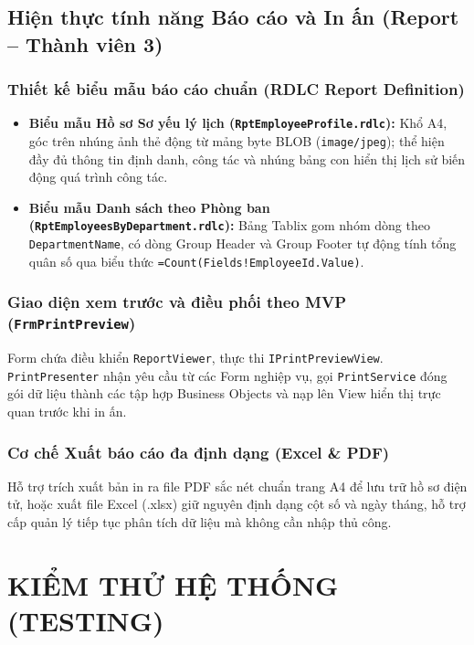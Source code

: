 \documentclass[12pt,a4paper]{report}
\begin{document}
\section{Hiện thực tính năng Báo cáo và In ấn (Report -- Thành viên 3)}

\subsection{Thiết kế biểu mẫu báo cáo chuẩn (RDLC Report Definition)}
\begin{itemize}[leftmargin=1.0cm]
    \item \textbf{Biểu mẫu Hồ sơ Sơ yếu lý lịch (\texttt{RptEmployeeProfile.rdlc}):} Khổ A4, góc trên nhúng ảnh thẻ động từ mảng byte BLOB (\texttt{image/jpeg}); thể hiện đầy đủ thông tin định danh, công tác và nhúng bảng con hiển thị lịch sử biến động quá trình công tác.
    \item \textbf{Biểu mẫu Danh sách theo Phòng ban (\texttt{RptEmployeesByDepartment.rdlc}):} Bảng Tablix gom nhóm dòng theo \texttt{DepartmentName}, có dòng Group Header và Group Footer tự động tính tổng quân số qua biểu thức \texttt{=Count(Fields!EmployeeId.Value)}.
\end{itemize}

\subsection{Giao diện xem trước và điều phối theo MVP (\texttt{FrmPrintPreview})}
Form chứa điều khiển \texttt{ReportViewer}, thực thi \texttt{IPrintPreviewView}. \texttt{PrintPresenter} nhận yêu cầu từ các Form nghiệp vụ, gọi \texttt{PrintService} đóng gói dữ liệu thành các tập hợp Business Objects và nạp lên View hiển thị trực quan trước khi in ấn.

\subsection{Cơ chế Xuất báo cáo đa định dạng (Excel \& PDF)}
Hỗ trợ trích xuất bản in ra file PDF sắc nét chuẩn trang A4 để lưu trữ hồ sơ điện tử, hoặc xuất file Excel (.xlsx) giữ nguyên định dạng cột số và ngày tháng, hỗ trợ cấp quản lý tiếp tục phân tích dữ liệu mà không cần nhập thủ công.

\chapter{KIỂM THỬ HỆ THỐNG (TESTING)}
\end{document}
